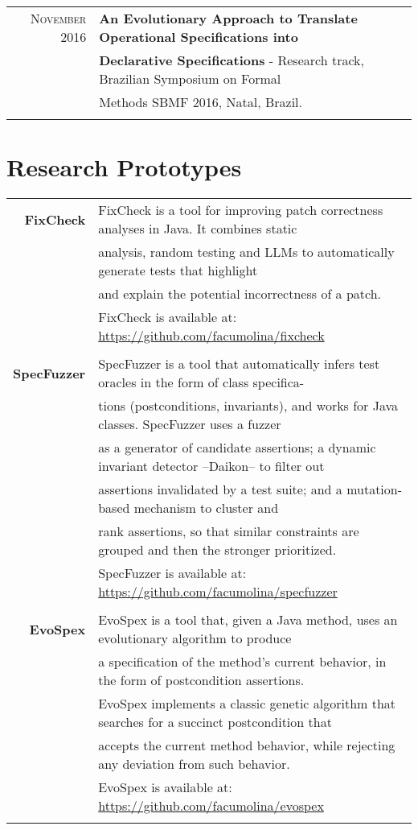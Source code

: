 \documentclass[a4paper,10pt]{article} %
\begin{document}
\begin{longtable}{rl}
\textsc{November} 2016 & \textbf{An Evolutionary Approach to Translate Operational Specifications into} \\
& \textbf{Declarative Specifications} - Research track, Brazilian Symposium on Formal \\ 
& Methods SBMF 2016, Natal, Brazil. \\ & \\

\end{longtable}

\section{Research Prototypes}
\begin{longtable}{rl}

\textbf{FixCheck} & FixCheck is a tool for improving patch correctness analyses in Java. It combines static \\ 
& analysis, random testing and LLMs to
automatically generate tests that highlight \\
& and explain the potential incorrectness of a patch. \\ 
& FixCheck is available at: \href{https://github.com/facumolina/fixcheck}{https://github.com/facumolina/fixcheck} \\ & \\

\textbf{SpecFuzzer} & SpecFuzzer is a tool that automatically infers test oracles in the form of class specifica-\\ 
& tions (postconditions, invariants), and works for Java classes. SpecFuzzer uses a fuzzer \\
& as a generator of candidate assertions; a dynamic invariant detector –Daikon– to filter out \\
& assertions invalidated by a test suite; and a mutation-based mechanism to cluster and \\
& rank assertions, so that similar constraints are grouped and then the stronger prioritized. \\ 
& SpecFuzzer is available at: \href{https://github.com/facumolina/specfuzzer}{https://github.com/facumolina/specfuzzer} \\ & \\


\textbf{EvoSpex} & EvoSpex is a tool that, given a Java method, uses an evolutionary algorithm to produce \\ 
& a specification of the method's current behavior, in the form of postcondition assertions. \\
& EvoSpex implements a classic genetic algorithm that searches for a succinct postcondition that \\ 
& accepts the current method behavior, while rejecting any deviation from such behavior. \\ 
& EvoSpex is available at: \href{https://github.com/facumolina/evospex}{https://github.com/facumolina/evospex} \\ & \\


\end{longtable}
\end{document}
